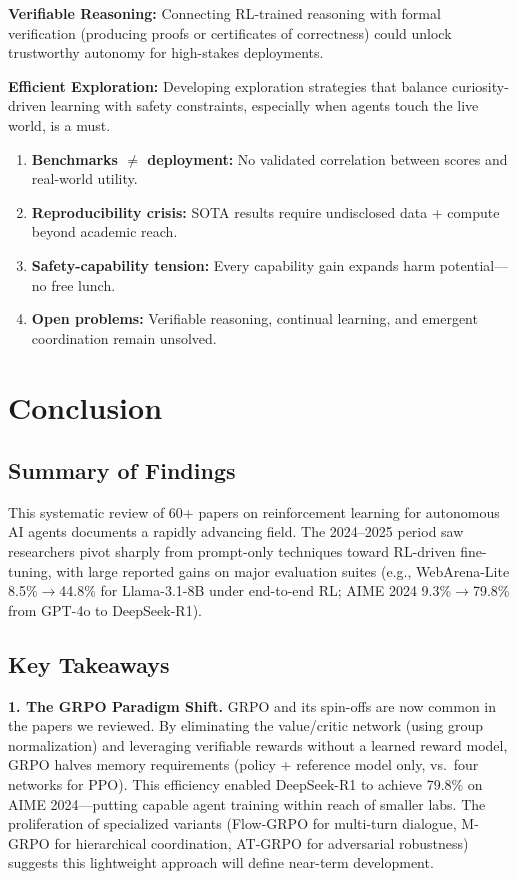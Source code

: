\documentclass[12pt,a4paper]{report}
\theoremstyle{definition}
\begin{document}
\textbf{Verifiable Reasoning:} Connecting RL-trained reasoning with formal verification (producing proofs or certificates of correctness) could unlock trustworthy autonomy for high-stakes deployments.

\textbf{Efficient Exploration:} Developing exploration strategies that balance curiosity-driven learning with safety constraints, especially when agents touch the live world, is a must.

\begin{tcolorbox}[colback=red!5!white, colframe=red!60!black, title=\textbf{Chapter 6 Key Takeaways}]
\begin{enumerate}
    \item \textbf{Benchmarks $\neq$ deployment:} No validated correlation between scores and real-world utility.
    \item \textbf{Reproducibility crisis:} SOTA results require undisclosed data + compute beyond academic reach.
    \item \textbf{Safety-capability tension:} Every capability gain expands harm potential---no free lunch.
    \item \textbf{Open problems:} Verifiable reasoning, continual learning, and emergent coordination remain unsolved.
\end{enumerate}
\end{tcolorbox}

\chapter{Conclusion}
\label{ch:conclusion}

\section*{Summary of Findings}
This systematic review of 60+ papers on reinforcement learning for autonomous AI agents documents a rapidly advancing field. The 2024--2025 period saw researchers pivot sharply from prompt-only techniques toward RL-driven fine-tuning, with large reported gains on major evaluation suites (e.g., WebArena-Lite 8.5\%$\rightarrow$44.8\% for Llama-3.1-8B under end-to-end RL; AIME 2024 9.3\%$\rightarrow$79.8\% from GPT-4o to DeepSeek-R1).

\section*{Key Takeaways}

\noindent\textbf{1. The GRPO Paradigm Shift.} GRPO and its spin-offs are now common in the papers we reviewed. By eliminating the value/critic network (using group normalization) and leveraging verifiable rewards without a learned reward model, GRPO halves memory requirements (policy + reference model only, vs.\ four networks for PPO). This efficiency enabled DeepSeek-R1 to achieve 79.8\% on AIME 2024---putting capable agent training within reach of smaller labs. The proliferation of specialized variants (Flow-GRPO for multi-turn dialogue, M-GRPO for hierarchical coordination, AT-GRPO for adversarial robustness) suggests this lightweight approach will define near-term development.
\end{document}
